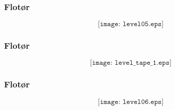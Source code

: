 \documentclass[aspectratio=169,xcolor=dvipsnames]{beamer}
\begin{document}
%
%
%
\begin{frame}
	\frametitle{Flotør}

$$\texttt{[image: level05.eps]}$$
\end{frame}
%
%
%
\begin{frame}
	\frametitle{Flotør}

$$\texttt{[image: level\_tape\_1.eps]}$$
\end{frame}
%
%
%
%
\begin{frame}
	\frametitle{Flotør}

$$\texttt{[image: level06.eps]}$$
\end{frame}
%
%
%
%
\end{document}
